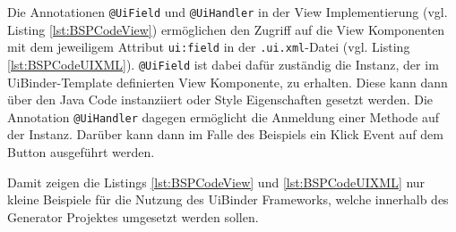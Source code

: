 Die Annotationen \texttt{@UiField} und \texttt{@UiHandler} in der View
Implementierung (vgl.
Listing \ref{lst:BSPCodeView}) ermöglichen den Zugriff auf die View Komponenten
mit dem jeweiligem Attribut \texttt{ui:field} in der \texttt{.ui.xml}-Datei
(vgl.
Listing \ref{lst:BSPCodeUIXML}). \texttt{@UiField} ist dabei dafür zuständig die
Instanz, der im UiBinder-Template definierten View Komponente, zu erhalten.
Diese kann dann über den Java Code instanziiert oder Style Eigenschaften gesetzt werden.
Die Annotation \texttt{@UiHandler} dagegen ermöglicht die Anmeldung einer
Methode auf der Instanz. Darüber kann dann im Falle des Beispiels ein Klick Event auf dem Button
ausgeführt werden.

Damit zeigen die Listings \ref{lst:BSPCodeView} und \ref{lst:BSPCodeUIXML}
nur kleine Beispiele für die Nutzung des UiBinder Frameworks, welche
innerhalb des Generator Projektes umgesetzt werden sollen.